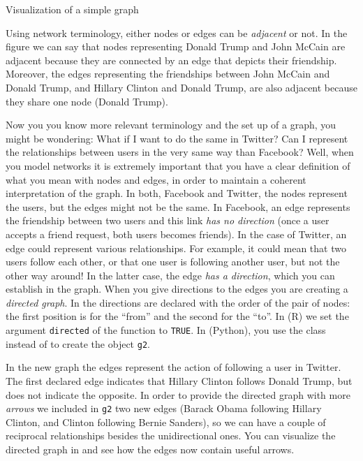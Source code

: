 \begin{ccsexample}
  \caption{Visualization of a simple graph}
  \label{ex:visgraph}
\end{ccsexample}

Using network terminology, either nodes or edges can be \textit{adjacent} or not. In the figure we can say that nodes representing Donald Trump and John McCain are adjacent because they are connected by an edge that depicts their friendship. Moreover, the edges representing the friendships between John McCain and Donald Trump, and Hillary Clinton and Donald Trump, are also adjacent because they share one node (Donald Trump).

Now you you know more relevant terminology and the set up of a graph, you might be wondering: What if I want to do the same in Twitter? Can I represent the relationships between users in the very same way than Facebook? Well, when you model networks it is extremely important that you have a clear definition of what you mean with nodes and edges, in order to maintain a coherent interpretation of the graph. In both, Facebook and Twitter, the nodes represent the users, but the edges might not be the same. In Facebook, an edge represents the friendship between two users and this link \textit{has no direction} (once a user accepts a friend request, both users becomes friends). In the case of Twitter, an edge could represent various relationships. For example, it could mean that two users follow each other, or that one user is following another user, but not the other way around! In the latter case, the edge \textit{has a direction}, which you can establish in the graph. When you give directions to the edges you are creating a \textit{directed graph}. In  the directions are declared with the order of the pair of nodes: the first position is for the ``from'' and the second for the ``to''. In  (R) we  set the argument \verb+directed+ of the function  to \verb+TRUE+. In  (Python), you use the class  instead of  to create the object \texttt{g2}.


In the new graph the edges represent the action of following a user in Twitter. The first declared edge indicates that Hillary Clinton follows Donald Trump, but does not indicate the opposite. In order to provide the directed graph with more \textit{arrows} we included in \texttt{g2} two new edges (Barack Obama following Hillary Clinton, and Clinton following Bernie Sanders), so we can have a couple of reciprocal relationships besides the unidirectional ones. You can visualize the directed graph in  and see how the edges now contain useful arrows.

